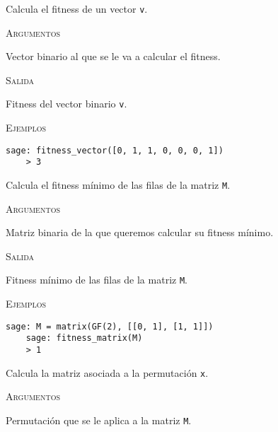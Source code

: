 \begin{description}[leftmargin=1em, font=\normalfont\ttfamily, style=nextline]
  \item[fitness\_vector(v)] Calcula el fitness de un vector \texttt{v}.

  \textsc{Argumentos}
  \begin{description}[font=\normalfont\ttfamily]
    \item[v] Vector binario al que se le va a calcular el fitness. 
  \end{description}

  \textsc{Salida}
  \begin{description}[font=\normalfont\ttfamily]
    \item[] Fitness del vector binario \texttt{v}.
  \end{description}

  \textsc{Ejemplos}
  \begin{lstlisting}[gobble=4]
    sage: fitness_vector([0, 1, 1, 0, 0, 0, 1])
    > 3
  \end{lstlisting}

  \item[fitness\_matrix(M)] Calcula el fitness mínimo de las filas de la matriz \texttt{M}.

  \textsc{Argumentos}
  \begin{description}[font=\normalfont\ttfamily]
    \item[M] Matriz binaria de la que queremos calcular su fitness mínimo.
  \end{description}

  \textsc{Salida}
  \begin{description}[font=\normalfont\ttfamily]
    \item[] Fitness mínimo de las filas de la matriz \texttt{M}.
  \end{description}

  \textsc{Ejemplos}
  \begin{lstlisting}[gobble=4]
    sage: M = matrix(GF(2), [[0, 1], [1, 1]])
    sage: fitness_matrix(M)
    > 1
  \end{lstlisting}

  \item[permutation\_matrix(x)] Calcula la matriz asociada a la permutación \texttt{x}.

  \textsc{Argumentos}
  \begin{description}[font=\normalfont\ttfamily]
    \item[x] Permutación que se le aplica a la matriz \texttt{M}.
  \end{description}


\end{description}
